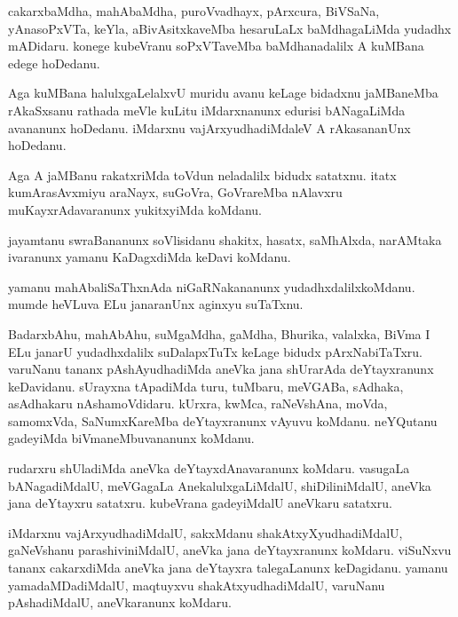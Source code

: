 \documentclass{article}
\begin{document}
\begin{mng}%
cakarxbaMdha, mahAbaMdha, puroVvadhayx, pArxcura, BiVSaNa, yAnasoPxVTa, keYla, aBivAsitxkaveMba 
hesaruLaLx baMdhagaLiMda yudadhx mADidaru. konege kubeVranu soPxVTaveMba baMdhanadalilx A kuMBana 
edege hoDedanu.
\end{mng}

\begin{mng}%
Aga kuMBana halulxgaLelalxvU muridu avanu keLage bidadxnu jaMBaneMba rAkaSxsanu rathada meVle 
kuLitu iMdarxnanunx edurisi bANagaLiMda avananunx hoDedanu. iMdarxnu vajArxyudhadiMdaleV A 
rAkasananUnx hoDedanu.
\end{mng}

\begin{mng}%
Aga A jaMBanu rakatxriMda toVdun neladalilx bidudx satatxnu. itatx kumArasAvxmiyu araNayx, suGoVra, 
GoVrareMba nAlavxru muKayxrAdavaranunx yukitxyiMda koMdanu.
\end{mng}

\begin{mng}%
jayamtanu swraBananunx soVlisidanu shakitx, hasatx, saMhAlxda, narAMtaka ivaranunx yamanu 
KaDagxdiMda keDavi koMdanu.
\end{mng}

\begin{mng}%
yamanu mahAbaliSaThxnAda niGaRNakananunx yudadhxdalilxkoMdanu. mumde heVLuva ELu janaranUnx aginxyu 
suTaTxnu.
\end{mng}

\begin{mng}%
BadarxbAhu, mahAbAhu, suMgaMdha, gaMdha, Bhurika, valalxka, BiVma I ELu janarU yudadhxdalilx 
suDalapxTuTx keLage bidudx pArxNabiTaTxru. varuNanu tananx pAshAyudhadiMda aneVka jana shUrarAda 
deYtayxranunx keDavidanu. sUrayxna tApadiMda turu, tuMbaru, meVGABa, sAdhaka, asAdhakaru 
nAshamoVdidaru. kUrxra, kwMca, raNeVshAna, moVda, samomxVda, SaNumxKareMba deYtayxranunx vAyuvu 
koMdanu. neYQutanu gadeyiMda biVmaneMbuvananunx koMdanu.
\end{mng}

\begin{mng}%
rudarxru shUladiMda aneVka deYtayxdAnavaranunx koMdaru. vasugaLa bANagadiMdalU, meVGagaLa 
AnekalulxgaLiMdalU, shiDiliniMdalU, aneVka jana deYtayxru satatxru. kubeVrana gadeyiMdalU aneVkaru 
satatxru.
\end{mng}

\begin{mng}%
iMdarxnu vajArxyudhadiMdalU, sakxMdanu shakAtxyXyudhadiMdalU, gaNeVshanu parashiviniMdalU, aneVka 
jana deYtayxranunx koMdaru. viSuNxvu tananx cakarxdiMda aneVka jana deYtayxra talegaLanunx 
keDagidanu. yamanu yamadaMDadiMdalU, maqtuyxvu shakAtxyudhadiMdalU, varuNanu pAshadiMdalU, 
aneVkaranunx koMdaru.
\end{mng}
\end{document}
